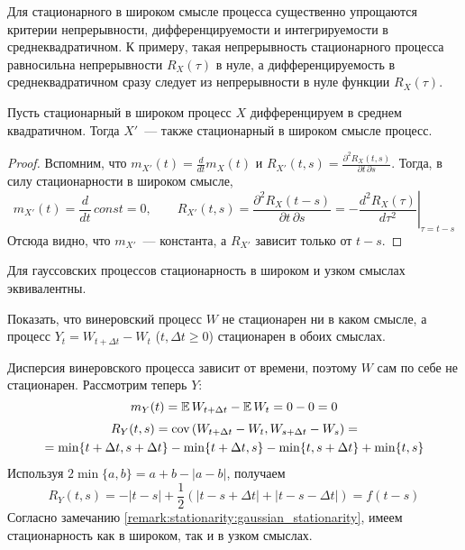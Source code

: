 Для стационарного в широком смысле процесса существенно упрощаются критерии непрерывности,
дифференцируемости и интегрируемости в среднеквадратичном.
К примеру, такая непрерывность стационарного процесса равносильна непрерывности $ R_X(\tau) $ в нуле,
а дифференцируемость в среднеквадратичном сразу следует из непрерывности в нуле функции $ R_X(\tau) $.

\begin{statement}
    \label{statement:stationary:stationary_derivative}
    Пусть стационарный в широком процесс $ X $ дифференцируем в среднем квадратичном.
    Тогда $ X' $~--- также стационарный в широком смысле процесс.
\end{statement}

\begin{proof}
    Вспомним, что $ \displaystyle m_{X'}(t) = \frac{d}{d t} m_X(t) $ и $ \displaystyle R_{X'}(t, s) = \frac{\partial^2 R_X(t, s)}{\partial t \, \partial s} $.
    Тогда, в силу стационарности в широком смысле,
    \[
        m_{X'}(t) = \frac{d}{d t} \, const = 0, \qquad
        R_{X'}(t, s) = \frac{\partial^2 R_X(t - s)}{\partial t \, \partial s} = - \left. \frac{d^2 R_X(\tau)}{d \tau^2} \right|_{\tau = t - s}
    \]
    Отсюда видно, что $ m_{X'} $~--- константа,
    а $ R_{X'} $ зависит только от $ t - s $.
\end{proof}


\begin{remark}
    \label{remark:stationarity:gaussian_stationarity}
    Для гауссовских процессов стационарность в широком и узком смыслах эквивалентны.
\end{remark}


\begin{exercise}
    \label{exercise:stationarity:wiener_process}
    Показать, что винеровский процесс $ W $ не стационарен ни в каком смысле,
    а процесс $ Y_t = W_{t + \Delta t} - W_t $ ($ t, \Delta t \geqslant 0 $) стационарен в обоих смыслах.
\end{exercise}

\begin{solution}
    Дисперсия винеровского процесса зависит от времени,
    поэтому $ W $ сам по себе не стационарен.
    Рассмотрим теперь $ Y $:
    \[
        m_Y(t) = \operatorname{\mathbb{E}} W_{t + \Delta t} - \operatorname{\mathbb{E}} W_t = 0 - 0 = 0
    \]
    \begin{multline*}
        R_Y(t, s) = \textnormal{cov}\left(W_{t + \Delta t} - W_t, W_{s + \Delta t} - W_s\right) = \\ =
        \min \{t + \Delta t, s + \Delta t\} - \min \{t + \Delta t, s\} - \min \{t, s + \Delta t\} + \min \{t, s\}
    \end{multline*}
    Используя $ 2 \min \{a, b\} = a + b - |a - b| $, получаем
    \[
        R_Y(t, s) = - |t - s| + \frac{1}{2} \left( |t - s + \Delta t| + |t - s - \Delta t| \right) = f(t - s)
    \]
    Согласно замечанию \ref{remark:stationarity:gaussian_stationarity},
    имеем стационарность как в широком, так и в узком смыслах.
\end{solution}


